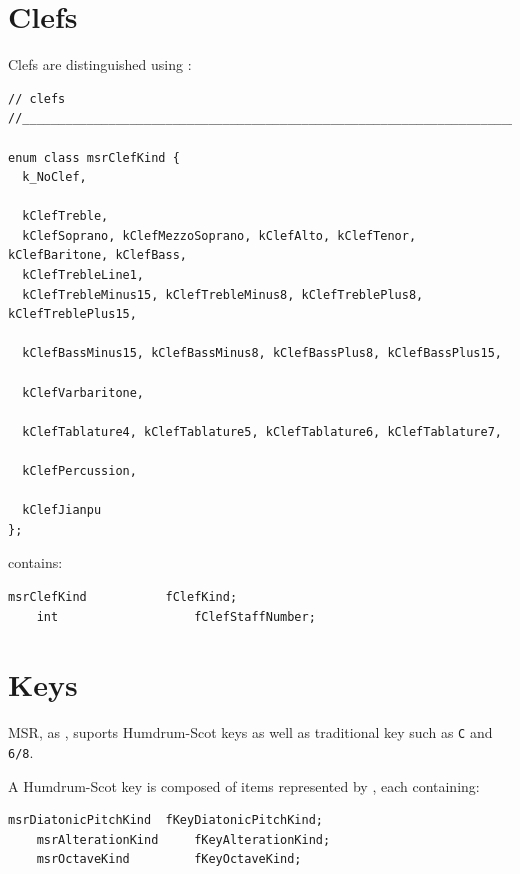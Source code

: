 \section{Clefs}\label{Clefs}

Clefs are distinguished using :
\begin{lstlisting}[language=CPlusPlus]
// clefs
//______________________________________________________________________________

enum class msrClefKind {
  k_NoClef,

  kClefTreble,
  kClefSoprano, kClefMezzoSoprano, kClefAlto, kClefTenor, kClefBaritone, kClefBass,
  kClefTrebleLine1,
  kClefTrebleMinus15, kClefTrebleMinus8, kClefTreblePlus8, kClefTreblePlus15,

  kClefBassMinus15, kClefBassMinus8, kClefBassPlus8, kClefBassPlus15,

  kClefVarbaritone,

  kClefTablature4, kClefTablature5, kClefTablature6, kClefTablature7,

  kClefPercussion,

  kClefJianpu
};
\end{lstlisting}

 contains:
\begin{lstlisting}[language=CPlusPlus]
    msrClefKind           fClefKind;
    int                   fClefStaffNumber;
\end{lstlisting}


\section{Keys}\label{Keys}

MSR, as \mxml, suports Humdrum-Scot keys as well as traditional key such as {\tt C} and {\tt 6/8}.

A Humdrum-Scot key is composed of items represented by , each containing:
\begin{lstlisting}[language=CPlusPlus]
    msrDiatonicPitchKind  fKeyDiatonicPitchKind;
    msrAlterationKind     fKeyAlterationKind;
    msrOctaveKind         fKeyOctaveKind;
\end{lstlisting}

